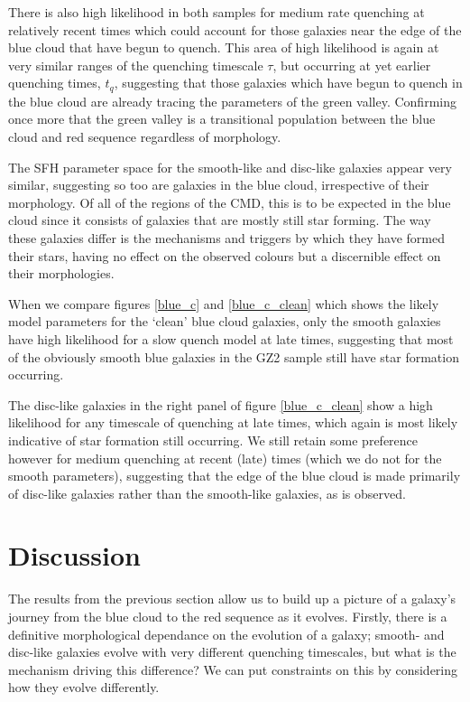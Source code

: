 \documentclass{mn2e}
\begin{document}
There is also high likelihood in both samples for medium rate quenching at relatively recent times which could account for those galaxies near the edge of the blue cloud that have begun to quench. This area of high likelihood is again at very similar ranges of the quenching timescale $\tau$, but occurring at yet earlier quenching times, $t_q$, suggesting that those galaxies which have begun to quench in the blue cloud are already tracing the parameters of the green valley. Confirming once more that the green valley is a transitional population between the blue cloud and red sequence regardless of morphology.

The SFH parameter space for the smooth-like and disc-like galaxies appear very similar, suggesting so too are galaxies in the blue cloud, irrespective of their morphology. Of all of the regions of the CMD, this is to be expected in the blue cloud since it consists of galaxies that are mostly still star forming. The way these galaxies differ is the mechanisms and triggers by which they have formed their stars, having no effect on the observed colours but a discernible effect on their morphologies.

When we compare figures \ref{blue_c} and \ref{blue_c_clean} which shows the likely model parameters for the `clean' blue cloud galaxies, only the smooth galaxies have high likelihood for a slow quench model at late times, suggesting that most of the obviously smooth blue galaxies in the GZ2 sample still have star formation occurring. 

The disc-like galaxies in the right panel of figure \ref{blue_c_clean} show a high likelihood for any timescale of quenching at late times, which again is most likely indicative of star formation still occurring. We still retain some preference however for medium quenching at recent (late) times (which we do not for the smooth parameters), suggesting that the edge of the blue cloud is made primarily of disc-like galaxies rather than the smooth-like galaxies, as is observed.


\section{Discussion}\label{diss}
The results from the previous section allow us to build up a picture of a galaxy's journey from the blue cloud to the red sequence as it evolves. Firstly, there is a definitive morphological dependance on the evolution of a galaxy; smooth- and disc-like galaxies evolve with very different quenching timescales, but what is the mechanism driving this difference? We can put constraints on this by considering how they evolve differently.
\end{document}
